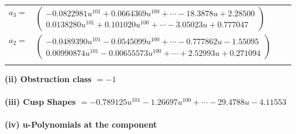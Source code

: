 \documentclass[1p]{elsarticle_modified}
\theoremstyle{definition}
\begin{document}
\begin{tabular}{m{7pt} m{180pt} m{7pt} m{180pt} }
\flushright $a_{3}=$&$\begin{pmatrix}-0.0822981 u^{101}+0.0664369 u^{100}+\cdots-18.3878 u+2.28500\\0.0138280 u^{101}+0.101020 u^{100}+\cdots-3.05023 u+0.777047\end{pmatrix}$ \\
\flushright $a_{2}=$&$\begin{pmatrix}-0.0489390 u^{101}-0.0545099 u^{100}+\cdots-0.777862 u-1.55095\\0.00990874 u^{101}-0.00655573 u^{100}+\cdots+2.52993 u+0.271094\end{pmatrix}$\\&\end{tabular}
\flushleft \textbf{(ii) Obstruction class $= -1$}\\~\\
\flushleft \textbf{(iii) Cusp Shapes $= -0.789125 u^{101}-1.26697 u^{100}+\cdots-29.4788 u-4.11553$}\\~\\
\newpage\renewcommand{\arraystretch}{1}
\flushleft \textbf{(iv) u-Polynomials at the component}\newline \\
\end{document}
